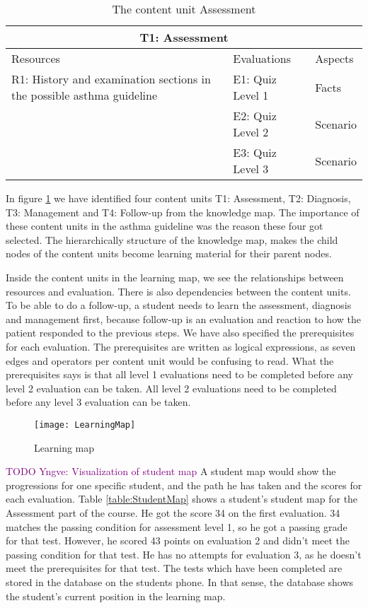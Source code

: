 \begin{table}[h!]
	\begin{tabular}{ | m{14em} | m{9em}| m{5em} | } 
		\hline
		\multicolumn{3}{c}{\bfseries T1: Assessment} \\
		\hline
		Resources & Evaluations & Aspects \\
		\hline
		R1: History and examination sections in the possible asthma guideline \parencite{RepublicofKeny2016} & E1: Quiz Level 1 & Facts \\
		& E2: Quiz Level 2 & Scenario \\
		& E3: Quiz Level 3 & Scenario \\
		\hline
	\end{tabular}
	\caption{The content unit Assessment}
	\label{table:ContentUnit}
\end{table}

In figure \ref{fig:LearningMap} we have identified four content units T1: Assessment, T2: Diagnosis, T3: Management and T4: Follow-up from the knowledge map. The importance of these content units in the asthma guideline \parencite{RepublicofKeny2016} was the reason these four got selected. The hierarchically structure of the knowledge map, makes the child nodes of the content units become learning material for their parent nodes.

Inside the content units in the learning map, we see the relationships between resources and evaluation. There is also dependencies between the content units. To be able to do a follow-up, a student needs to learn the assessment, diagnosis and management first, because follow-up is an evaluation and reaction to how the patient responded to the previous steps.  We have also specified the prerequisites for each evaluation. The prerequisites are written as logical expressions, as seven edges and operators per content unit would be confusing to read. What the prerequisites says is that all level 1 evaluations need to be completed before any level 2 evaluation can be taken. All level 2 evaluations need to be completed before any level 3 evaluation can be taken.

\begin{figure}[h!]
	\texttt{[image: LearningMap]}
	\caption {Learning map}
	\label{fig:LearningMap}
\end{figure}

\textcolor{purple}{TODO Yngve: Visualization of student map}
A student map would show the progressions for one specific student, and the path he has taken and the scores for each evaluation. Table \ref{table:StudentMap} shows a student's student map for the Assessment part of the course. He got the score 34 on the first evaluation. 34 matches the passing condition for assessment level 1, so he got a passing grade for that test. However, he scored 43 points on evaluation 2 and didn't meet the passing condition for that test. He has no attempts for evaluation 3, as he doesn't meet the prerequisites for that test.  The tests which have been completed are stored in the database on the students phone. In that sense, the database shows the student's current position in the learning map.

